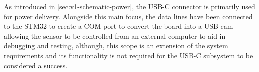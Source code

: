 As introduced in \autoref{sec:v1-schematic-power}, the USB-C connector is primarily used for power delivery. Alongside this main focus, the data lines have been connected to the STM32 to create a COM port to convert the board into a USB-cam - allowing the sensor to be controlled from an external computer to aid in debugging and testing, although, this scope is an extension of the system requirements and its functionality is not required for the USB-C subsystem to be considered a success.